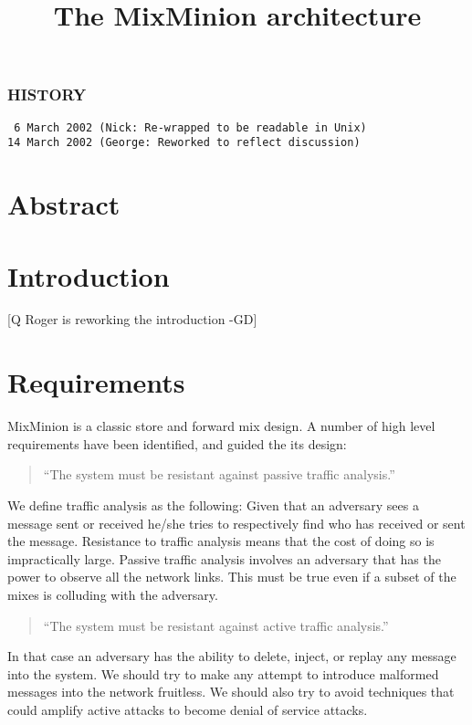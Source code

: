 \documentclass{article}
\begin{document}
\title{The MixMinion architecture}
\maketitle

\subsubsection{HISTORY}
\begin{verbatim}
 6 March 2002 (Nick: Re-wrapped to be readable in Unix)
14 March 2002 (George: Reworked to reflect discussion)
\end{verbatim}

\section{Abstract}
\section{Introduction}

[Q Roger is reworking the introduction -GD]

\section{Requirements}

MixMinion is a classic store and forward mix design. A number of high
level requirements have been identified, and guided the its design:

\begin{quote}
     ``The system must be resistant against passive traffic analysis.''
\end{quote}

We define traffic analysis as the following: Given that an adversary
sees a message sent or received he/she tries to respectively find who
has received or sent the message. Resistance to traffic analysis means
that the cost of doing so is impractically large. Passive traffic
analysis involves an adversary that has the power to observe all the
network links. This must be true even if a subset of the mixes is
colluding with the adversary.

\begin{quote}
     ``The system must be resistant against active traffic analysis.''
\end{quote}

In that case an adversary has the ability to delete, inject, or replay 
any message into the system. We should try to make any attempt to
introduce malformed messages into the network fruitless. We should
also try to avoid techniques that could amplify active attacks to
become denial of service attacks.
\end{document}
